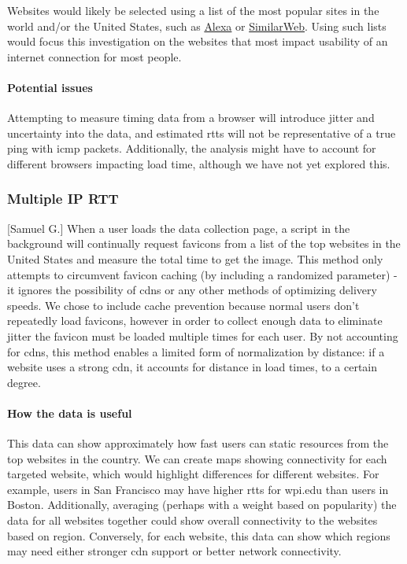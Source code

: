\documentclass[12pt]{article}
\begin{document}
Websites would likely be selected using a list of the most popular sites in the world and/or the United States, such as \href{www.alexa.com/topsites}{Alexa} or \href{www.similarweb.com/top-websites}{SimilarWeb}. Using such lists would focus this investigation on the websites that most impact usability of an internet connection for most people.

\paragraph{Potential issues}
Attempting to measure timing data from a browser will introduce jitter and uncertainty into the data, and estimated \acrshort{rtt}s will not be representative of a true ping with \acrfull{icmp} packets. Additionally, the analysis might have to account for different browsers impacting load time, although we have not yet explored this.

\subsubsection{Multiple IP RTT}[Samuel G.]
When a user loads the data collection page, a script in the background will continually request favicons from a list of the top websites in the United States and measure the total time to get the image. This method only attempts to circumvent favicon caching (by including a randomized parameter) - it ignores the possibility of \acrshort{cdn}s or any other methods of optimizing delivery speeds. We chose to include cache prevention because normal users don't repeatedly load favicons, however in order to collect enough data to eliminate jitter the favicon must be loaded multiple times for each user. By not accounting for \acrshort{cdn}s, this method enables a limited form of normalization by distance: if a website uses a strong \acrshort{cdn}, it accounts for distance in load times, to a certain degree.

\paragraph{How the data is useful}
This data can show approximately how fast users can static resources from the top websites in the country. We can create maps showing connectivity for each targeted website, which would highlight differences for different websites. For example, users in San Francisco may have higher \acrshort{rtt}s for wpi.edu than users in Boston. Additionally, averaging (perhaps with a weight based on popularity) the data for all websites together could show overall connectivity to the websites based on region. Conversely, for each website, this data can show which regions may need either stronger \acrshort{cdn} support or better network connectivity.
\end{document}
